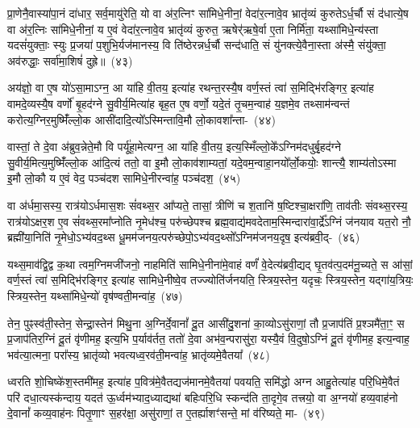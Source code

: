 प्रा॒णेनै॒वास्या॑पा॒नं दा॑धार॒ सर्व॒मायु॑रेति॒ यो वा अ॑र॒त्निꣳ सा॑मिधे॒नीनां॒ वेदा॑र॒त्नावे॒व भ्रातृ॑व्यं कुरुते\-ऽर्ध॒र्चौ सं द॑धात्ये॒ष वा अ॑र॒त्निः सा॑मिधे॒नीनां॒ य ए॒वं वेदा॑र॒त्नावे॒व भ्रातृ॑व्यं कुरुत॒ ऋषेर्॑\mbox{}ऋषे॒र्वा ए॒ता निर्मि॑ता॒ यथ्सा॑मिधे॒न्य॑स्ता यदसं॑युक्ताः॒ स्युः प्र॒जया॑ प॒शुभि॒र्यज॑मानस्य॒ वि ति॑ष्ठेरन्नर्ध॒र्चौ सन्द॑धाति॒ सं यु॑नक्त्ये॒वैना॒स्ता अ॑स्मै॒ संयु॑क्ता॒ अव॑रुद्धाः॒ सर्वा॑मा॒शिषं॑ दुह्रे॥~(४३)


{\anuvakamend[{ब॒र्॒\mbox{}सं वो॑ जायन्ते॒ प्र वो॒ वाजा॑ लभेत दधाति॒ सन्दश॑ च}]}%

अय॑ज्ञो॒ वा ए॒ष यो॑\-ऽसा॒मा\-ऽग्न॒ आ या॑हि वी॒तय॒ इत्या॑ह रथन्त॒रस्यै॒ष वर्ण॒स्तं त्वा॑ स॒मिद्भि॑रङ्गिर॒ इत्या॑ह वामदे॒व्यस्यै॒ष वर्णो॑ बृ॒हद॑ग्ने सु॒वीर्य॒मित्या॑ह बृह॒त ए॒ष वर्णो॒ यदे॒तं तृ॒चम॒न्वाह॑ य॒ज्ञमे॒व तथ्साम॑न्वन्तं करोत्य॒ग्निर॒मुष्मिँ॑ल्लो॒क आसी॑दादि॒त्यो᳚\-ऽस्मिन्तावि॒मौ लो॒कावशा᳚न्ता-~(४४)

वास्तां॒ ते दे॒वा अ॑ब्रुव॒न्नेते॒मौ वि पर्यू॑हा॒मेत्यग्न॒ आ या॑हि वी॒तय॒ इत्य॒स्मिँल्लो॒के᳚\-ऽग्निम॑दधुर्बृ॒हद॑ग्ने सु॒वीर्य॒मित्य॒मुष्मिँ॑ल्लो॒क आ॑दि॒त्यं ततो॒ वा इ॒मौ लो॒काव॑शाम्यतां॒ यदे॒वम॒न्वाहा॒नयो᳚र्लो॒कयोः॒ शान्त्यै॒ शाम्य॑तो\-ऽस्मा इ॒मौ लो॒कौ य ए॒वं वेद॒ पञ्च॑दश सामिधे॒नीरन्वा॑ह॒ पञ्च॑दश॒~(४५)

वा अ॑र्धमा॒सस्य॒ रात्र॑यो\-ऽर्धमास॒शः सं॑वथ्स॒र आ᳚प्यते॒ तासां॒ त्रीणि॑ च श॒तानि॑ ष॒ष्टिश्चा॒क्षरा॑णि॒ ताव॑तीः संवथ्स॒रस्य॒ रात्र॑यो\-ऽक्षर॒श ए॒व सं॑वथ्स॒रमा᳚प्नोति नृ॒मेध॑श्च॒ परु॑च्छेपश्च ब्रह्म॒वाद्य॑मवदेताम॒स्मिन्दारा॑वा॒र्द्रे᳚\-ऽग्निं ज॑नयाव यत॒रो नौ॒ ब्रह्मी॑या॒निति॑ नृ॒मेधो॒\-ऽभ्य॑वद॒थ्स धू॒मम॑जनय॒त्परु॑च्छेपो॒\-ऽभ्य॑वद॒थ्सो᳚\-ऽग्निम॑जनय॒दृष॒ इत्य॑ब्रवी॒द्-~(४६)

यथ्स॒माव॑द्वि॒द्व क॒था त्वम॒ग्निमजी॑जनो॒ नाहमिति॑ सामिधे॒नीना॑मे॒वाहं वर्णं॑ वे॒देत्य॑ब्रवी॒द्यद् घृ॒तव॑त्प॒दम॑नू॒च्यते॒ स आ॑सां॒ वर्ण॒स्तं त्वा॑ स॒मिद्भि॑रङ्गिर॒ इत्या॑ह सामिधे॒नीष्वे॒व तज्ज्योति॑र्जनयति॒ स्त्रिय॒स्तेन॒ यदृचः॒ स्त्रिय॒स्तेन॒ यद्गा॑य॒त्रियः॒ स्त्रिय॒स्तेन॒ यथ्सा॑मिधे॒न्यो॑ वृष॑ण्वती॒मन्वा॑ह॒~(४७)

तेन॒ पुꣴस्व॑ती॒स्तेन॒ सेन्द्रा॒स्तेन॑ मिथु॒ना अ॒ग्निर्दे॒वानां᳚ दू॒त आसी॑दु॒शना॑ का॒व्यो\-ऽसु॑राणां॒ तौ प्र॒जा\-प॑तिं प्र॒श्ञमै॑ता॒ꣳ॒ स प्र॒जा\-प॑तिर॒ग्निं दू॒तं वृ॑णीमह॒ इत्य॒भि प॒र्याव॑र्तत॒ ततो॑ दे॒वा अभ॑व॒न्परासु॑रा॒ यस्यै॒वं वि॒दुषो॒\-ऽग्निं दू॒तं वृ॑णीमह॒ इत्य॒न्वाह॒ भव॑त्या॒त्मना॒ परा᳚स्य॒ भ्रातृ॑व्यो भवत्यध्व॒रव॑ती॒मन्वा॑ह॒ भ्रातृ॑व्यमे॒वैतया᳚~(४८)

ध्वरति शो॒चिष्के॑श॒स्तमी॑मह॒ इत्या॑ह प॒वित्र॑मे॒वैतद्यज॑\-मान\-मे॒वै\-तया॑ पवयति॒ समि॑द्धो अग्न आहु॒तेत्या॑ह परि॒धिमे॒वैतं परि॑ दधा॒\-त्य\-स्क॑न्दाय॒ यदत॑ ऊ॒र्ध्वम॑भ्याद॒ध्याद्यथा॑ बहिःपरि॒धि स्कन्द॑ति ता॒दृगे॒व तत्त्रयो॒ वा अ॒ग्नयो॑ हव्य॒वाह॑नो दे॒वानां᳚ कव्य॒वाह॑नः पितृ॒णाꣳ स॒हर॑क्षा॒ असु॑राणां॒ त ए॒तर्\mbox{}ह्याशꣳ॑सन्ते॒ मां व॑रिष्यते॒ मा-~(४९)

